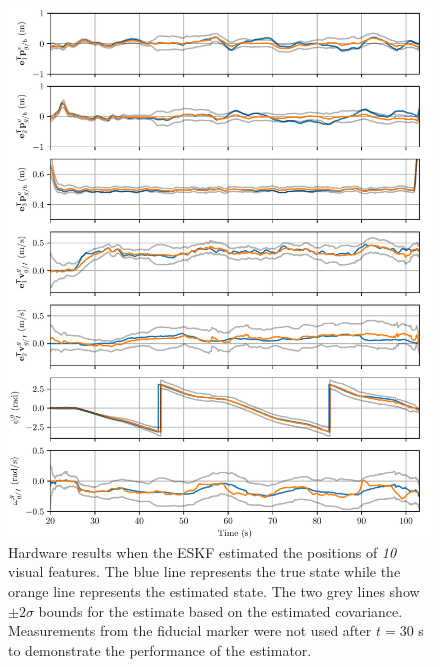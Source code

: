 \begin{figure}
  \centering
  \includegraphics[width=6.5in]{plots/hardware_results}
  \caption[ESKF Hardware Results Using 10 Visual Features]{Hardware results when
    the ESKF estimated the positions of \emph{10} visual
  features. The blue line represents the true state while the orange line
  represents the estimated state. The two grey lines show $\pm 2 \sigma$ bounds for
  the estimate based on the estimated covariance. Measurements from the fiducial
  marker were not used after $t = 30$ s to demonstrate the performance of the estimator.}
  \label{fig:est_hardware}
\end{figure}
